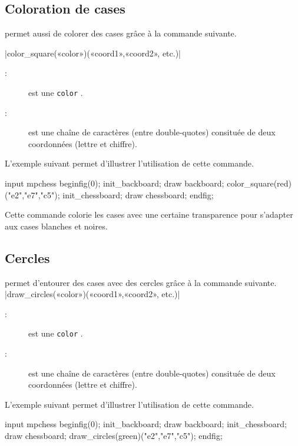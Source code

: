 \documentclass[french]{ltxdoc}
\begin{document}
\subsection{Coloration de cases}
\mpchess permet aussi de colorer des cases grâce à la commande suivante.

\commande|color_square(«color»)(«coord1»,«coord2», etc.)|\smallskip

\begin{description}
\item[:] est une \lstinline+color+ \MP.
\item[:] est une chaîne de caractères (entre double-quotes) consituée de deux coordonnées (lettre et chiffre).
\end{description}

L’exemple suivant permet d’illustrer l’utilisation de cette commande.

\begin{ExempleMP}
input mpchess
beginfig(0);
init_backboard;
draw backboard;
color_square(red)("e2","e7","c5");
init_chessboard;
draw chessboard;
endfig;
\end{ExempleMP}

Cette commande colorie les cases avec une certaine transparence pour s’adapter
aux cases blanches et noires.

\subsection{Cercles}
\mpchess permet d’entourer des cases avec des cercles grâce à la commande
suivante.
\commande|draw_circles(«color»)(«coord1»,«coord2», etc.)|\smallskip

\begin{description}
\item[:] est une \lstinline+color+ \MP.
\item[:] est une chaîne de caractères (entre double-quotes) consituée de deux coordonnées (lettre et chiffre).
\end{description}

L’exemple suivant permet d’illustrer l’utilisation de cette commande.

\begin{ExempleMP}
input mpchess
beginfig(0);
init_backboard;
draw backboard;
init_chessboard;
draw chessboard;
draw_circles(green)("e2","e7","c5");
endfig;
\end{ExempleMP}
\end{document}
